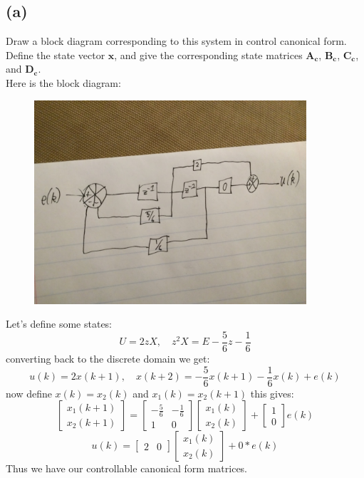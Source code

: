 \documentclass{article}
\begin{document}
\subsection*{(a)}
Draw a block diagram corresponding to this system in control canonical form. Define the state vector $\boldsymbol{x}$, and give the corresponding state matrices $\boldsymbol{A_c}$, $\boldsymbol{B_c}$, $\boldsymbol{C_c}$, and $\boldsymbol{D_c}$.\\
Here is the block diagram:
\begin{figure}[H]
    \centering
    \includegraphics[width=0.9\textwidth]{PR1.jpg}
\end{figure}
Let's define some states:
\[U=2zX,\quad z^2X=E-\frac{5}{6}z-\frac{1}{6}\]
converting back to the discrete domain we get:
\[u(k)=2x(k+1),\quad x(k+2)=-\frac{5}{6}x(k+1)-\frac{1}{6}x(k)+e(k)\]
now define $x(k)=x_2(k)$ and $x_1(k)=x_2(k+1)$ this gives:
\[\begin{bmatrix}x_1(k+1)\\x_2(k+1)\end{bmatrix}=\begin{bmatrix}-\frac{5}{6} &-\frac{1}{6}\\1&0\end{bmatrix}\begin{bmatrix}x_1(k)\\x_2(k)\end{bmatrix}+\begin{bmatrix}1\\0\end{bmatrix}e(k)\]
\[u(k)=\begin{bmatrix}2&0\end{bmatrix}\begin{bmatrix}x_1(k)\\x_2(k)\end{bmatrix}+0*e(k)\]
Thus we have our controllable canonical form matrices.
\end{document}
